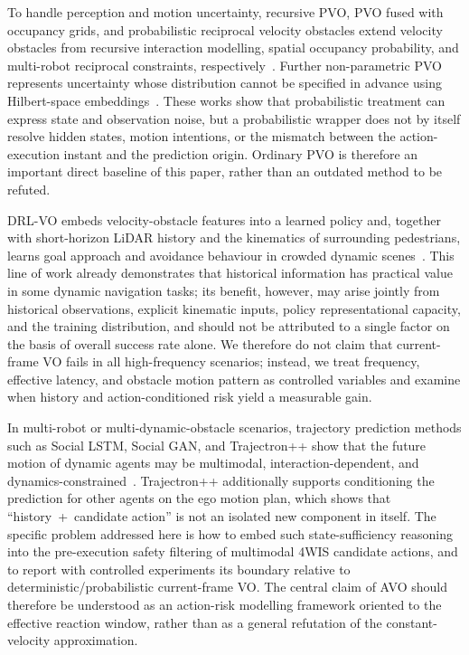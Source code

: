 \documentclass[10pt,a4paper,twocolumn]{article}
\begin{document}
To handle perception and motion uncertainty, recursive PVO, PVO fused with occupancy grids, and probabilistic reciprocal velocity obstacles extend velocity obstacles from recursive interaction modelling, spatial occupancy probability, and multi-robot reciprocal constraints, respectively~\cite{kluge2006rpvo,fulgenzi2007pvo,gopalakrishnan2017prvo}. Further non-parametric PVO represents uncertainty whose distribution cannot be specified in advance using Hilbert-space embeddings~\cite{poonganam2020pvo}. These works show that probabilistic treatment can express state and observation noise, but a probabilistic wrapper does not by itself resolve hidden states, motion intentions, or the mismatch between the action-execution instant and the prediction origin. Ordinary PVO is therefore an important direct baseline of this paper, rather than an outdated method to be refuted.

DRL-VO embeds velocity-obstacle features into a learned policy and, together with short-horizon LiDAR history and the kinematics of surrounding pedestrians, learns goal approach and avoidance behaviour in crowded dynamic scenes~\cite{xie2023drlvo}. This line of work already demonstrates that historical information has practical value in some dynamic navigation tasks; its benefit, however, may arise jointly from historical observations, explicit kinematic inputs, policy representational capacity, and the training distribution, and should not be attributed to a single factor on the basis of overall success rate alone. We therefore do not claim that current-frame VO fails in all high-frequency scenarios; instead, we treat frequency, effective latency, and obstacle motion pattern as controlled variables and examine when history and action-conditioned risk yield a measurable gain.

In multi-robot or multi-dynamic-obstacle scenarios, trajectory prediction methods such as Social LSTM, Social GAN, and Trajectron++ show that the future motion of dynamic agents may be multimodal, interaction-dependent, and dynamics-constrained~\cite{alahi2016sociallstm,gupta2018socialgan,salzmann2020trajectron}. Trajectron++ additionally supports conditioning the prediction for other agents on the ego motion plan, which shows that ``history~+~candidate action'' is not an isolated new component in itself. The specific problem addressed here is how to embed such state-sufficiency reasoning into the pre-execution safety filtering of multimodal 4WIS candidate actions, and to report with controlled experiments its boundary relative to deterministic/probabilistic current-frame VO. The central claim of AVO should therefore be understood as an action-risk modelling framework oriented to the effective reaction window, rather than as a general refutation of the constant-velocity approximation.
\end{document}
